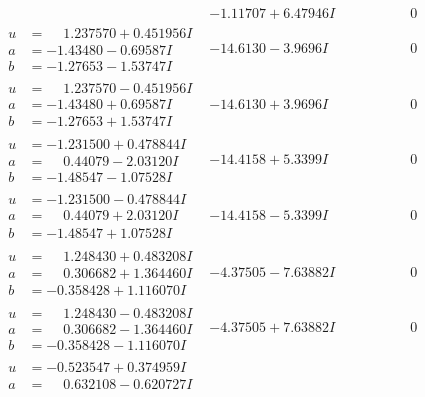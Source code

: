 \documentclass[1p]{elsarticle_modified}
\theoremstyle{definition}
\begin{document}
$$\begin{array}{c|c|c}
 & -1.11707 + 6.47946 I & \phantom{-0.000000 } 0 \\ \hline\begin{aligned}
u &= \phantom{-}1.237570 + 0.451956 I \\
a &= -1.43480 - 0.69587 I \\
b &= -1.27653 - 1.53747 I\end{aligned}
 & -14.6130 - 3.9696 I & \phantom{-0.000000 } 0 \\ \hline\begin{aligned}
u &= \phantom{-}1.237570 - 0.451956 I \\
a &= -1.43480 + 0.69587 I \\
b &= -1.27653 + 1.53747 I\end{aligned}
 & -14.6130 + 3.9696 I & \phantom{-0.000000 } 0 \\ \hline\begin{aligned}
u &= -1.231500 + 0.478844 I \\
a &= \phantom{-}0.44079 - 2.03120 I \\
b &= -1.48547 - 1.07528 I\end{aligned}
 & -14.4158 + 5.3399 I & \phantom{-0.000000 } 0 \\ \hline\begin{aligned}
u &= -1.231500 - 0.478844 I \\
a &= \phantom{-}0.44079 + 2.03120 I \\
b &= -1.48547 + 1.07528 I\end{aligned}
 & -14.4158 - 5.3399 I & \phantom{-0.000000 } 0 \\ \hline\begin{aligned}
u &= \phantom{-}1.248430 + 0.483208 I \\
a &= \phantom{-}0.306682 + 1.364460 I \\
b &= -0.358428 + 1.116070 I\end{aligned}
 & -4.37505 - 7.63882 I & \phantom{-0.000000 } 0 \\ \hline\begin{aligned}
u &= \phantom{-}1.248430 - 0.483208 I \\
a &= \phantom{-}0.306682 - 1.364460 I \\
b &= -0.358428 - 1.116070 I\end{aligned}
 & -4.37505 + 7.63882 I & \phantom{-0.000000 } 0 \\ \hline\begin{aligned}
u &= -0.523547 + 0.374959 I \\
a &= \phantom{-}0.632108 - 0.620727 I \\

\end{aligned}
\end{array}$$
\end{document}
